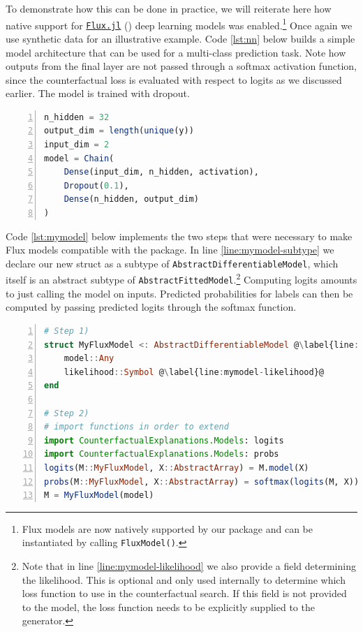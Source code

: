 \documentclass{juliacon}
\begin{document}
To demonstrate how this can be done in practice, we will reiterate here
how native support for \href{https://fluxml.ai/}{\texttt{Flux.jl}}
(\cite{innes2018flux}) deep learning models was enabled.\footnote{Flux
  models are now natively supported by our package and can be
  instantiated by calling \texttt{FluxModel()}.} Once again we use
synthetic data for an illustrative example. Code \ref{lst:nn} below
builds a simple model architecture that can be used for a multi-class
prediction task. Note how outputs from the final layer are not passed
through a softmax activation function, since the counterfactual loss is
evaluated with respect to logits as we discussed earlier. The model is
trained with dropout.

\begin{lstlisting}[language=Julia, escapechar=@, numbers=left, label={lst:nn}, caption={A simple neural network model.}]
n_hidden = 32
output_dim = length(unique(y))
input_dim = 2
model = Chain(
    Dense(input_dim, n_hidden, activation),
    Dropout(0.1),
    Dense(n_hidden, output_dim)
)  
\end{lstlisting}

Code \ref{lst:mymodel} below implements the two steps that were
necessary to make Flux models compatible with the package. In line
\ref{line:mymodel-subtype} we declare our new struct as a subtype of
\texttt{AbstractDifferentiableModel}, which itself is an abstract
subtype of \texttt{AbstractFittedModel}.\footnote{Note that in line
  \ref{line:mymodel-likelihood} we also provide a field determining the
  likelihood. This is optional and only used internally to determine
  which loss function to use in the counterfactual search. If this field
  is not provided to the model, the loss function needs to be explicitly
  supplied to the generator.} Computing logits amounts to just calling
the model on inputs. Predicted probabilities for labels can then be
computed by passing predicted logits through the softmax function.

\begin{lstlisting}[language=Julia, escapechar=@, numbers=left, label={lst:mymodel}, caption={A wrapper for Flux models.}]
# Step 1)
struct MyFluxModel <: AbstractDifferentiableModel @\label{line:mymodel-subtype}@
    model::Any
    likelihood::Symbol @\label{line:mymodel-likelihood}@
end

# Step 2)
# import functions in order to extend
import CounterfactualExplanations.Models: logits
import CounterfactualExplanations.Models: probs 
logits(M::MyFluxModel, X::AbstractArray) = M.model(X)
probs(M::MyFluxModel, X::AbstractArray) = softmax(logits(M, X))
M = MyFluxModel(model)
\end{lstlisting}
\end{document}
